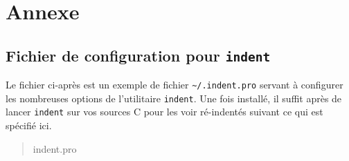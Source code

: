 \documentclass {article}
\begin{document}
\appendix

\section {Annexe}

\subsection {Fichier de configuration pour \texttt {indent}}
    \label {indentpro}

Le fichier ci-après est un exemple de fichier \verb|~/.indent.pro|
servant à configurer les nombreuses options de l'utilitaire \texttt
{indent}. Une fois installé, il suffit après de lancer \texttt
{indent} sur vos sources C pour les voir ré-indentés suivant ce qui
est spécifié ici.

\begin {quote}
     {indent.pro}
\end {quote}
\end{document}
